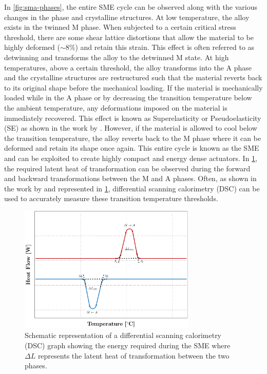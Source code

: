 In \cref{fig:sma-phases}, the entire SME cycle can be observed along with the various changes in the phase and crystalline structures. At low temperature, the alloy exists in the twinned M phase. When subjected to a certain critical stress threshold, there are some shear lattice distortions that allow the material to be highly deformed ($\sim8$\%) and retain this strain. This effect is often referred to as detwinning and transforms the alloy to the detwinned M state. At high temperatures, above a certain threshold, the alloy transforms into the A phase and the crystalline structures are restructured such that the material reverts back to its original shape before the mechanical loading. If the material is mechanically loaded while in the A phase or by decreasing the transition temperature below the ambient temperature, any deformations imposed on the material is immediately recovered. This effect is known as Superelasticity or Pseudoelasticity (SE) as shown in the work by \cite{otsukaPseudoelasticityShapeMemory1986}. However, if the material is allowed to cool below the transition temperature, the alloy reverts back to the M phase where it can be deformed and retain its shape once again. This entire cycle is known as the SME and can be exploited to create highly compact and energy dense actuators. In \cref{fig:dsc-graph}, the required latent heat of transformation can be observed during the forward and backward transformations between the M and A phases. Often, as shown in the work by \cite{heDSCAnalysisReverse2004} and represented in \cref{fig:dsc-graph}, differential scanning calorimetry (DSC) can be used to accurately measure these transition temperature thresholds.

\begin{figure}[hbt]
    \centering
    \includegraphics[width=0.75\textwidth]{images/chap2/dsc-graph.pdf}
    \caption[Schematic representation of a differential scanning calorimetry (DSC) graph showing the energy required during the SME]{Schematic representation of a differential scanning calorimetry (DSC) graph showing the energy required during the SME where $\Delta L$ represents the latent heat of transformation between the two phases.}
    \label{fig:dsc-graph}
\end{figure}

